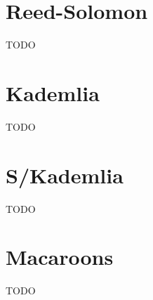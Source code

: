 \documentclass[a4paper,10pt]{article} \usepackage[utf8]{inputenc}
\newcommand{\todo}[1]{{\color{red} TODO #1}}
\begin{document}
\section{Reed-Solomon}

\todo{}

\section{Kademlia}

\todo{}

\section{S/Kademlia}

\todo{}

\section{Macaroons}

\todo{}

\newpage  \begingroup \raggedright
 \endgroup
\end{document}

